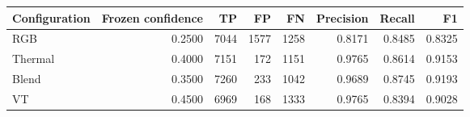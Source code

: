 \begin{tabular}{lrrrrrrr}
\toprule
Configuration & Frozen confidence & TP & FP & FN & Precision & Recall & F1 \\
\midrule
RGB & 0.2500 & 7044 & 1577 & 1258 & 0.8171 & 0.8485 & 0.8325 \\
Thermal & 0.4000 & 7151 & 172 & 1151 & 0.9765 & 0.8614 & 0.9153 \\
Blend & 0.3500 & 7260 & 233 & 1042 & 0.9689 & 0.8745 & 0.9193 \\
VT & 0.4500 & 6969 & 168 & 1333 & 0.9765 & 0.8394 & 0.9028 \\
\bottomrule
\end{tabular}
